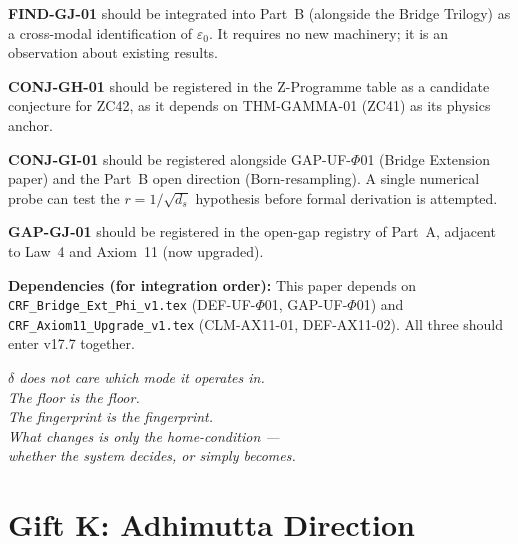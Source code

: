 \documentclass[12pt, a4paper]{article}
\providecommand{\eps}{\varepsilon_0}
\begin{document}
\begin{keybox}[title={Placement in CRF Complete Edition}]
\textbf{FIND-GJ-01} should be integrated into Part~B
(alongside the Bridge Trilogy) as a cross-modal
identification of $\eps$. It requires no new machinery;
it is an observation about existing results.

\textbf{CONJ-GH-01} should be registered in the
Z-Programme table as a candidate conjecture for ZC42,
as it depends on THM-GAMMA-01 (ZC41) as its physics anchor.

\textbf{CONJ-GI-01} should be registered alongside
GAP-UF-$\Phi$01 (Bridge Extension paper) and the
Part~B open direction (Born-resampling). A single
numerical probe can test the $r = 1/\sqrt{d_s}$
hypothesis before formal derivation is attempted.

\textbf{GAP-GJ-01} should be registered in the
open-gap registry of Part~A, adjacent to Law~4
and Axiom~11 (now upgraded).

\textbf{Dependencies (for integration order):}
This paper depends on
\texttt{CRF\_Bridge\_Ext\_Phi\_v1.tex} (DEF-UF-$\Phi$01,
GAP-UF-$\Phi$01) and
\texttt{CRF\_Axiom11\_Upgrade\_v1.tex} (CLM-AX11-01,
DEF-AX11-02). All three should enter v17.7 together.
\end{keybox}

\bigskip
\begin{center}
\textit{$\delta$ does not care which mode it operates in.\\
The floor is the floor.\\
The fingerprint is the fingerprint.\\
What changes is only the home-condition ---\\
whether the system decides, or simply becomes.}
\end{center}





\newpage

\section{Gift K: Adhimutta Direction}
\label{sec:gift-k}
\end{document}
